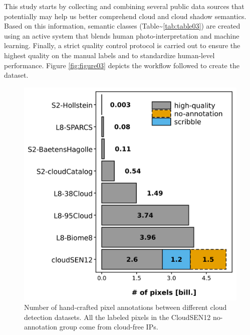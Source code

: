 \documentclass[a4paper, nobind]{templates/cdethesis}
\begin{document}
This study starts by collecting and combining several public data sources that potentially may help us better comprehend cloud and cloud shadow semantics. Based on this information, semantic classes (Table\textasciitilde{}\ref{tab:table03}) are created using an active system that blends human photo-interpretation and machine learning. Finally, a strict quality control protocol is carried out to ensure the highest quality on the manual labels and to standardize human-level performance. Figure \ref{fig:figure03} depicts the workflow followed to create the dataset.

\begin{figure}[!h]
    \centering
    \includegraphics[width=0.7\linewidth]{figures/chapter01/figure02.png}
    \caption{Number of hand-crafted pixel annotations between different cloud detection datasets. All the labeled pixels in the CloudSEN12 no-annotation group come from cloud-free IPs.}
    \label{fig:figure02}
\end{figure}
\end{document}
